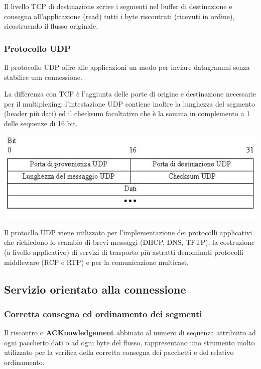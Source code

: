             Il livello TCP di destinazione scrive i segmenti nel buffer di destinazione e consegna all'applicazione (read) tutti i byte riscontrati (ricevuti in ordine), ricostruendo il flusso originale.

        \subsubsection{Protocollo UDP}
            Il protocollo UDP offre alle applicazioni un modo per inviare datagrammi senza stabilire una connessione.
        
            La differenza con TCP è l'aggiunta delle porte di origine e destinazione necessarie per il multiplexing: l'intestazione UDP contiene inoltre la lunghezza del segmento (header più dati) ed il checksum facoltativo che è la somma in complemento a 1 delle sequenze di 16 bit.

            \begin{center}
                \includegraphics[scale=0.45]{chapters/5/assets/schema_f.png}
            \end{center}

            Il protocllo UDP viene utilizzato per l'implementazione dei protocolli applicativi che richiedono lo scambio di brevi messaggi (DHCP, DNS, TFTP), la costruzione (a livello applicativo) di servizi di trasporto più astratti denominati protocolli middleware (RCP e RTP) e per la comunicazione multicast.

    \subsection{Servizio orientato alla connessione}
        \subsubsection{Corretta consegna ed ordinamento dei segmenti}
            Il riscontro o \textbf{ACKnowledgement} abbinato al numero di sequenza attribuito ad ogni pacchetto dati o ad ogni byte del flusso, rappresentano uno strumento molto utilizzato per la verifica della corretta consegna dei pacchetti e del relativo ordinamento.
        
